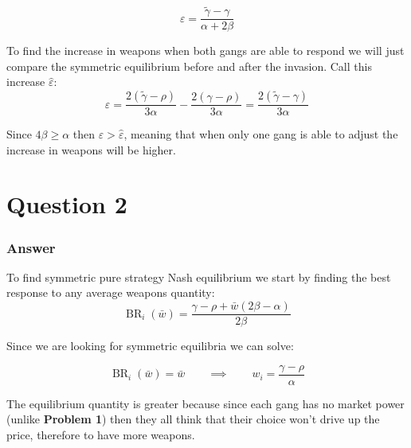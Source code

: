 \documentclass{article}
\theoremstyle{definition}
\newcommand{\qiq}{\qquad \implies \qquad}
\begin{document}
$$\varepsilon = \frac{\tilde{\gamma} -\gamma}{\alpha +2 \beta }$$

To find the increase in weapons when both gangs are able to respond we will just compare the symmetric  equilibrium before and after the invasion. Call this increase $\hat{\varepsilon}$:
$$\varepsilon = \frac{2(\tilde{\gamma} - \rho)}{3\alpha}- \frac{2(\gamma - \rho)}{3\alpha} = \frac{2(\tilde{\gamma} - \gamma)}{3\alpha}$$

Since $4\beta \geq \alpha$ then $\varepsilon > \hat{\varepsilon}$, meaning that when only one gang is able to adjust the increase in weapons will be higher.

\section{Question 2}
\subsubsection*{Answer}

To find symmetric pure strategy Nash equilibrium we start by finding the best response to any average weapons quantity:
$$\operatorname{BR}_i(\bar{w}) = \frac{\gamma - \rho + \bar{w}(2\beta - \alpha)}{2\beta}$$

Since we are looking for symmetric equilibria we can solve:

$$\operatorname{BR}_i(\bar{w}) = \bar{w} \qiq w_i = \frac{\gamma - \rho}{\alpha} $$

The equilibrium quantity is greater because since each gang has no market power (unlike \textbf{Problem  1}) then they all think that their choice won't drive up the price, therefore to have more weapons.
\end{document}
